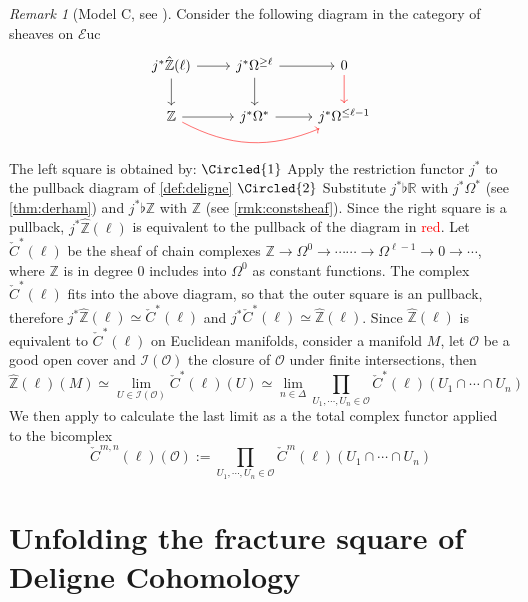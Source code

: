 \documentclass[10pt]{amsart}
\newcommand{\I}{\mathscr{I}}
\newcommand{\bR}{\mathbb{R}}
\newcommand{\bZ}{\mathbb{Z}}
\newcommand{\Euc}{\mathscr{E}\mathrm{uc}}
\theoremstyle{definition}
\theoremstyle{remark}
\newtheorem{remark}[equation]{Remark}
\numberwithin{equation}{section}
\begin{document}
\begin{remark}[Model C, see {\cite[Lemma 7.3.4]{amabeldebrayhaine2021diffcoh}}]\label{rmk:C} Consider the following diagram in the category of {sheaves} on $\Euc$
  \[\begin{tikzcd}
     j^*\hat{\bZ}(\ell)\arrow[d]\arrow[r] & j^*\Omega^{\geq \ell}\arrow[d] \arrow[r] & 0\arrow[d,color=red] \\
    \bZ \arrow[r]\arrow[rr,bend right=2.5em,color=red] & j^*\Omega^*\arrow[r] & j^*\Omega^{\leq\ell-1}
  \end{tikzcd}\] The left square is obtained by: $\Circled{1}$ Apply the restriction functor $j^*$ to the pullback diagram of \cref{def:deligne} $\Circled{2}$ Substitute $j^*\flat\bR$ with $j^*\Omega^*$ (see \cref{thm:derham}) and $j^*\flat\bZ$ with $\bZ$ (see \cref{rmk:constsheaf}). Since the right square is a pullback, $j^*\hat{\bZ}(\ell)$ is equivalent to the pullback of the diagram in \textcolor{red}{red}. Let $\check{C}^*(\ell)$ be the sheaf of chain complexes $\bZ\to\Omega^0\to\cdots\cdots\to\Omega^{\ell-1}\to0\to\cdots$, where $\bZ$ is in degree 0 includes into $\Omega^0$ as constant functions. The complex $\check{C}^*(\ell)$ fits into the above diagram, so that the outer square is an pullback, therefore $j^*\hat{\bZ}(\ell)\simeq\check{C}^*(\ell)$ and $j^*\check{C}^*(\ell)\simeq\hat{\bZ}(\ell)$. Since $\hat{\bZ}(\ell)$ is equivalent to $\check{C}^*(\ell)$ on Euclidean manifolds, consider a manifold $M$, let $\mathscr{O}$ be a good open cover and $\I(\mathscr O)$ the closure of $\mathscr{O}$ under finite intersections, then
\[
    \hat{\bZ}(\ell)(M) \simeq\lim_{U\in\I(\mathscr O)} \check{C}^*(\ell)(U)\simeq\lim_{n\in\Delta}\prod_{U_1,\cdots,U_n\in\mathscr{O}}\check{C}^*(\ell)(U_1\cap\cdots\cap U_n) 
  \]
  We then apply \cite[Lemma 7.10]{bunkenikolausvoelkl2016diffcoh} to calculate the last limit as a the total complex functor applied to the bicomplex \[\check{C}^{m,n}(\ell)(\mathscr{O}):=\prod_{U_1,\cdots,U_n\in\mathscr{O}}\check{C}^m(\ell)(U_1\cap\cdots\cap U_n)\]
\end{remark}




\section{Unfolding the fracture square of Deligne Cohomology}
\end{document}
